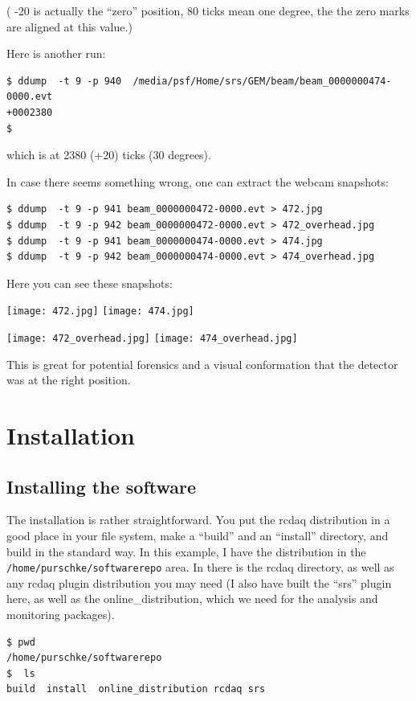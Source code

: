 \documentclass{article}[11pt]
\begin{document}
( -20 is actually the ``zero'' position, 80 ticks mean one degree, the the zero marks are aligned at this value.)

Here is another run:

\begin{verbatim} 
$ ddump  -t 9 -p 940  /media/psf/Home/srs/GEM/beam/beam_0000000474-0000.evt
+0002380
$ 
\end{verbatim} 

which is at 2380 (+20) ticks (30 degrees).

In case there seems something wrong, one can extract the webcam snapshots:

\begin{verbatim} 
$ ddump  -t 9 -p 941 beam_0000000472-0000.evt > 472.jpg
$ ddump  -t 9 -p 942 beam_0000000472-0000.evt > 472_overhead.jpg
$ ddump  -t 9 -p 941 beam_0000000474-0000.evt > 474.jpg
$ ddump  -t 9 -p 942 beam_0000000474-0000.evt > 474_overhead.jpg
\end{verbatim} 

Here you can see these snapshots:

\texttt{[image: 472.jpg]}
\texttt{[image: 474.jpg]}

\texttt{[image: 472\_overhead.jpg]}
\texttt{[image: 474\_overhead.jpg]}

This is great for potential forensics and a visual conformation that the detector
was at the right position. 



\section{Installation}

\subsection{Installing the software}
\label{installation}

The installation is rather straightforward. You put the rcdaq
distribution in a good place in your file system, make a ``build'' and
an ``install'' directory, and build in the standard way. In this
example, I have the distribution in the
\verb|/home/purschke/softwarerepo| area. In there is the rcdaq
directory, as well as any rcdaq plugin distribution you may need (I
also have built the ``srs'' plugin here, as well as the
online\_distribution, which we need for the analysis and monitoring
packages).

\begin{verbatim} 
$ pwd
/home/purschke/softwarerepo
$  ls
build  install  online_distribution rcdaq srs
\end{verbatim}
\end{document}
